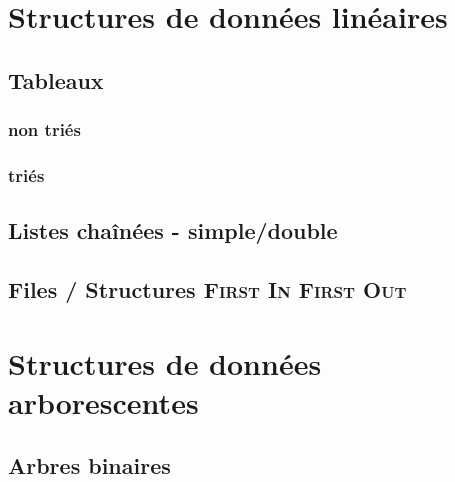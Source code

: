 \documentclass{report}
\begin{document}

\chapter{Structures de données linéaires}
\section{Tableaux}
\subsection{non triés}
\subsection{triés}
\section{Listes chaînées - simple/double}
\section{Files / Structures \textsc{First In First Out}}

\chapter{Structures de données arborescentes}
\section{Arbres binaires}
\end{document}

